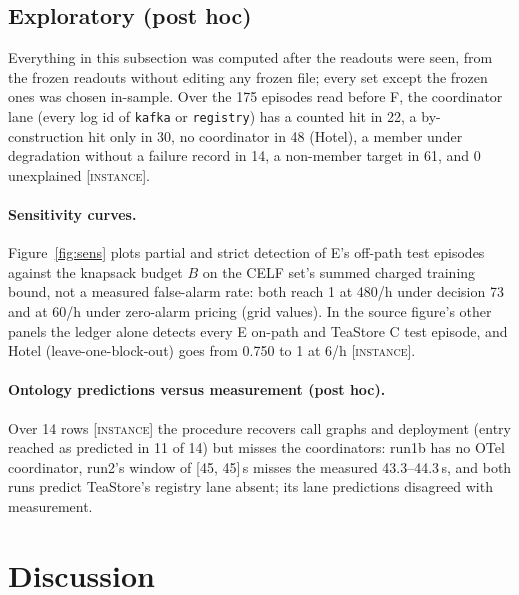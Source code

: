 \documentclass{ceurart}
\newcommand{\scope}[1]{\textsc{[#1]}}
\begin{document}
\subsection{Exploratory (post hoc)}\label{sec:lanes}
Everything in this subsection was computed after the readouts were seen, from the frozen readouts without editing any
frozen file; every set except the frozen ones was chosen in-sample. Over the 175 episodes read before F, the coordinator lane (every log id of
\texttt{kafka} or \texttt{registry}) has a counted hit in 22, a by-construction hit only in 30, no coordinator in 48
(Hotel), a member under degradation without a failure record in 14, a non-member target in 61, and 0 unexplained
\scope{instance}. %

\paragraph{Sensitivity curves.}
Figure~\ref{fig:sens} plots partial and strict detection of E's off-path test episodes against the knapsack budget $B$
on the CELF set's summed charged training bound, not a measured false-alarm rate: both reach 1 at 480/h under decision
73 and at 60/h under zero-alarm pricing (grid values). In the source figure's other panels the ledger alone detects
every E on-path and TeaStore C test episode, and Hotel (leave-one-block-out) goes from 0.750 to 1 at 6/h \scope{instance}.


\paragraph{Ontology predictions versus measurement (post hoc).} %
Over 14 rows \scope{instance} the procedure recovers call graphs and deployment (entry reached as predicted in 11 of 14) but
misses the coordinators: run1b has no OTel coordinator, run2's window of [45, 45]\,s misses the measured 43.3--44.3\,s, and
both runs predict TeaStore's registry lane absent; its lane predictions disagreed with measurement.

\section{Discussion}\label{sec:discussion}
\end{document}

